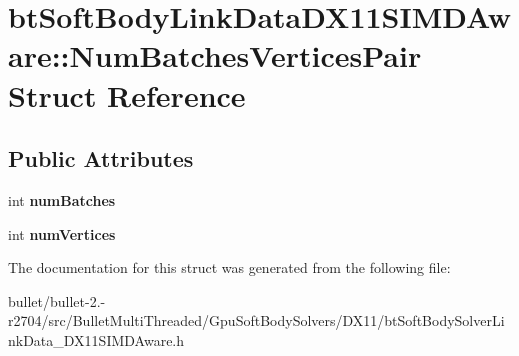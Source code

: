 \hypertarget{structbt_soft_body_link_data_d_x11_s_i_m_d_aware_1_1_num_batches_vertices_pair}{\section{bt\+Soft\+Body\+Link\+Data\+D\+X11\+S\+I\+M\+D\+Aware\+:\+:Num\+Batches\+Vertices\+Pair Struct Reference}
\label{structbt_soft_body_link_data_d_x11_s_i_m_d_aware_1_1_num_batches_vertices_pair}
}
\subsection*{Public Attributes}
\begin{DoxyCompactItemize}
\item 
\hypertarget{structbt_soft_body_link_data_d_x11_s_i_m_d_aware_1_1_num_batches_vertices_pair_aebdc90925a238865276c3b8890798604}{int {\bfseries num\+Batches}}\label{structbt_soft_body_link_data_d_x11_s_i_m_d_aware_1_1_num_batches_vertices_pair_aebdc90925a238865276c3b8890798604}

\item 
\hypertarget{structbt_soft_body_link_data_d_x11_s_i_m_d_aware_1_1_num_batches_vertices_pair_a9a5924e0d081443b5467c3a37d52cada}{int {\bfseries num\+Vertices}}\label{structbt_soft_body_link_data_d_x11_s_i_m_d_aware_1_1_num_batches_vertices_pair_a9a5924e0d081443b5467c3a37d52cada}

\end{DoxyCompactItemize}


The documentation for this struct was generated from the following file\+:\begin{DoxyCompactItemize}
\item 
bullet/bullet-\/2.-\/r2704/src/\+Bullet\+Multi\+Threaded/\+Gpu\+Soft\+Body\+Solvers/\+D\+X11/bt\+Soft\+Body\+Solver\+Link\+Data\+\_\+\+D\+X11\+S\+I\+M\+D\+Aware.\+h\end{DoxyCompactItemize}
